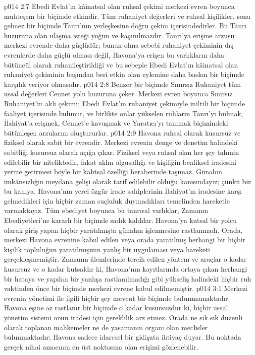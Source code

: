 \vs p014 2:7 Ebedi Evlat’ın kâinatsal olan ruhsal çekimi merkezi evren boyunca muhteşem bir biçimde etkindir. Tüm ruhaniyet değerleri ve ruhsal kişilikler, sonu gelmez bir biçimde Tanrı’nın yerleşkesine doğru çekim içerisindedirler. Bu Tanrı huzuruna olan ulaşma isteği yoğun ve kaçınılmazdır. Tanrı’ya erişme arzusu merkezi evrende daha güçlüdür; bunun olma sebebi ruhaniyet çekiminin dış evrenlerde daha güçlü olması değil, Havona’ya erişen bu varlıkların daha bütüncül olarak ruhanileştirildiği ve bu sebeple Ebedi Evlat’ın kâinatsal olan ruhaniyet çekiminin başından beri etkin olan eylemine daha baskın bir biçimde karşılık veriyor olmasıdır.
\vs p014 2:8 Benzer bir biçimde Sınırsız Ruhaniyet tüm ussal değerleri Cennet yolu huzuruna çeker. Merkezi evren boyunca Sınırsız Ruhaniyet’in akli çekimi; Ebedi Evlat’ın ruhaniyet çekimiyle iniltili bir biçimde faaliyet içerisinde bulunur, ve birlikte onlar yükselen ruhların Tanrı’yı bulmak, İlahiyat’a erişmek, Cennet’e kavuşmak ve Yaratıcı’yı tanımak biçimindeki bütünleşen arzularını oluştururlar.
\vs p014 2:9 Havona ruhsal olarak kusursuz ve fiziksel olarak sabit bir evrendir. Merkezi evrenin denge ve denetim halindeki sabitliği kusursuz olarak açığa çıkar. Fiziksel veya ruhsal olan her şey tahmin edilebilir bir niteliktedir, fakat aklın olgusallığı ve kişiliğin benliksel iradesini yerine getirmesi böyle bir kalıtsal özelliği beraberinde taşımaz. Günahın imkânsızlığın meydana gelişi olarak tarif edilebilir olduğu kanısındayız; çünkü biz bu kanıya, Havona’nın yerel özgür irade sahiplerinin İlahiyat’ın iradesine karşı gelmedikleri için hiçbir zaman suçluluk duymadıkları temelinden hareketle varmaktayız. Tüm ebediyet boyunca bu tanrısal varlıklar, Zamanın Ebediyetleri’ne kararlı bir biçimde sadık kaldılar. Havona’ya kutsal bir yolcu olarak giriş yapan hiçbir yaratılmışta günahın işlenmesine rastlanmadı. Orada, merkezi Havona evrenine kabul edilen veya orada yaratılmış herhangi bir hiçbir kişilik topluluğun yaratılmışının yanlış bir uygulaması veya hareketi gerçekleşmemiştir. Zamanın âlemlerinde tercih edilen yöntem ve araçlar o kadar kusursuz ve o kadar kutsaldır ki, Havona’nın kayıtlarında ortaya çıkan herhangi bir hataya ve yapılan bir yanlışa rastlanılmadığı gibi yükseliş halindeki hiçbir ruh vaktinden önce bir biçimde merkezi evrene kabul edilmemiştir.
\vs p014 3:1 Merkezi evrenin yönetimi ile ilgili hiçbir şey mevcut bir biçimde bulunmamaktadır. Havona eşine az rastlanır bir biçimde o kadar kusursuzdur ki, hiçbir ussal yönetim sistemi onun iradesi için gereklilik arz etmez. Orada ne sık sık düzenli olarak toplanan mahkemeler ne de yasamanın organı olan meclisler bulunmaktadır; Havona sadece idaresel bir gidişata ihtiyaç duyar. Bu noktada gerçek  nihai amacının en üst noktasına olan erişimi gözlenebilir.
